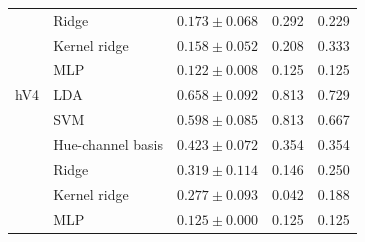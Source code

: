 \begin{table}[h]
\begin{tabular}{llccc}
   & Ridge & $0.173 \pm 0.068$ & 0.292 & 0.229 \\
   & Kernel ridge & $0.158 \pm 0.052$ & 0.208 & 0.333 \\
   & MLP & $0.122 \pm 0.008$ & 0.125 & 0.125 \\
\midrule
hV4 & LDA & $\mathbf{0.658 \pm 0.092}$ & 0.813 & 0.729 \\
   & SVM & $0.598 \pm 0.085$ & 0.813 & 0.667 \\
   & Hue-channel basis & $0.423 \pm 0.072$ & 0.354 & 0.354 \\
   & Ridge & $0.319 \pm 0.114$ & 0.146 & 0.250 \\
   & Kernel ridge & $0.277 \pm 0.093$ & 0.042 & 0.188 \\
   & MLP & $0.125 \pm 0.000$ & 0.125 & 0.125 \\
\bottomrule
\end{tabular}
\end{table}

